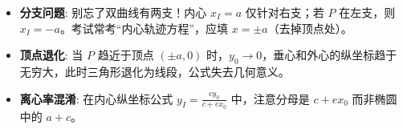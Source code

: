 \begin{trapbox}
\begin{itemize}
    \item \textbf{分支问题}: 别忘了双曲线有两支！内心 $x_I = a$ 仅针对右支；若 $P$ 在左支，则 $x_I = -a$。考试常考“内心轨迹方程”，应填 $x = \pm a$（去掉顶点处）。
    \item \textbf{顶点退化}: 当 $P$ 趋近于顶点 $(\pm a, 0)$ 时，$y_0 \to 0$，垂心和外心的纵坐标趋于无穷大，此时三角形退化为线段，公式失去几何意义。
    \item \textbf{离心率混淆}: 在内心纵坐标公式 $y_I = \frac{cy_0}{c+ex_0}$ 中，注意分母是 $c+ex_0$ 而非椭圆中的 $a+c$。
\end{itemize}
\end{trapbox}